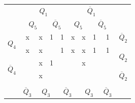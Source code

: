 \documentclass[a4paper,14pt]{article}
\begin{document}
\begin{table}[H]
	\begin{minipage}{.5\linewidth}
		\centering
\begin{tabular}{cccccccccc}
	& \multicolumn{4}{c}{$Q_1$}                                                                         & \multicolumn{4}{c}{$\overline{Q}_1$}                                                              &                        \\
	& \multicolumn{2}{c}{$Q_5$}                       & \multicolumn{2}{c}{$\overline{Q}_5$}            & \multicolumn{2}{c}{$Q_5$}                       & \multicolumn{2}{c}{$\overline{Q}_5$}            &                        \\ \cline{2-9}
	\multicolumn{1}{c|}{\multirow{2}{*}{$Q_4$}}            & \multicolumn{1}{c|}{x} & \multicolumn{1}{c|}{x} & \multicolumn{1}{c|}{1} & \multicolumn{1}{c|}{1} & \multicolumn{1}{c|}{x} & \multicolumn{1}{c|}{x} & \multicolumn{1}{c|}{1} & \multicolumn{1}{c|}{1} & $\overline{Q}_2$       \\ \cline{2-9}
	\multicolumn{1}{c|}{}                                  & \multicolumn{1}{c|}{x} & \multicolumn{1}{c|}{x} & \multicolumn{1}{c|}{}  & \multicolumn{1}{c|}{1} & \multicolumn{1}{c|}{x} & \multicolumn{1}{c|}{x} & \multicolumn{1}{c|}{1} & \multicolumn{1}{c|}{1} & \multirow{2}{*}{$Q_2$} \\ \cline{2-9}
	\multicolumn{1}{c|}{\multirow{2}{*}{$\overline{Q}_4$}} & \multicolumn{1}{c|}{}  & \multicolumn{1}{c|}{x} & \multicolumn{1}{c|}{1} & \multicolumn{1}{c|}{}  & \multicolumn{1}{c|}{}  & \multicolumn{1}{c|}{x} & \multicolumn{1}{c|}{}  & \multicolumn{1}{c|}{}  &                        \\ \cline{2-9}
	\multicolumn{1}{c|}{}                                  & \multicolumn{1}{c|}{}  & \multicolumn{1}{c|}{x} & \multicolumn{1}{c|}{}  & \multicolumn{1}{c|}{}  & \multicolumn{1}{c|}{}  & \multicolumn{1}{c|}{}  & \multicolumn{1}{c|}{}  & \multicolumn{1}{c|}{}  & $\overline{Q}_2$       \\ \cline{2-9}
	&                        & \multicolumn{2}{c}{}                            & \multicolumn{2}{c}{}                            & \multicolumn{2}{c}{}                            &                        &                        \\
	& $\overline{Q}_3$       & \multicolumn{2}{c}{$Q_3$}                       & \multicolumn{2}{c}{$\overline{Q}_3$}            & \multicolumn{2}{c}{$Q_3$}                       & $\overline{Q}_3$       &                       

\end{tabular}
\end{minipage}
\end{table}
\end{document}
